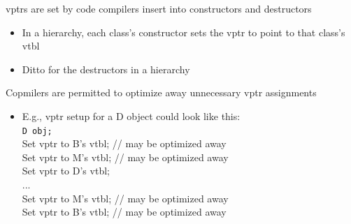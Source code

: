 vptrs are set by code compilers insert into constructors and destructors
\begin{itemize}
  \item In a hierarchy, each class's constructor sets the vptr to point to that class's vtbl
  \item Ditto for the destructors in a hierarchy
\end{itemize}
Copmilers are permitted to optimize away unnecessary vptr assignments\\
\begin{minipage}{0.7\linewidth}
\begin{itemize}
  \item E.g., vptr setup for a D object could look like this:\\
    \lstinline{D obj;}\\
    Set vptr to B's vtbl; // may be optimized away\\
    Set vptr to M's vtbl; // may be optimized away\\
    Set vptr to D's vtbl;\\
    ...\\
    Set vptr to M's vtbl; // may be optimized away\\
    Set vptr to B's vtbl; // may be optimized away
\end{itemize}
\end{minipage}%
